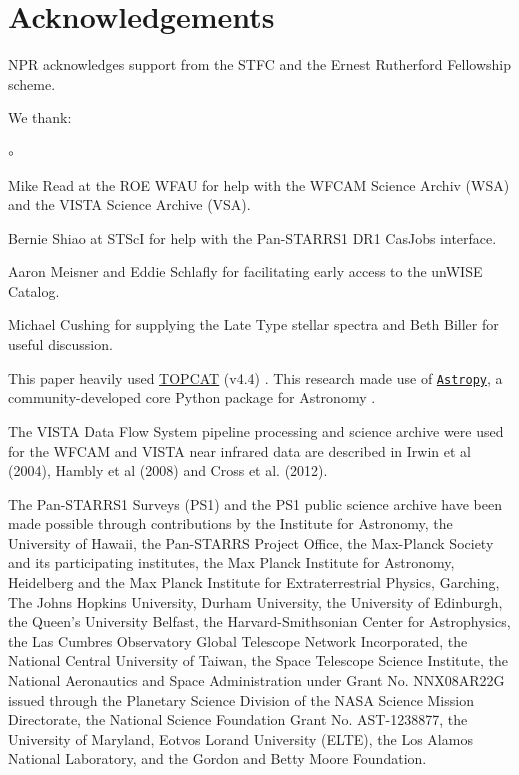 \documentclass[usenatbib]{mnras}
\begin{document}
\section*{Acknowledgements}
NPR acknowledges support from the STFC and the Ernest Rutherford Fellowship scheme. 

We thank:
\begin{list}{$\circ$}{}  
\item Mike Read at the ROE WFAU for help with the WFCAM Science Archiv (WSA) and the VISTA Science Archive (VSA). 
\item Bernie Shiao at STScI for help with the Pan-STARRS1 DR1 CasJobs interface. 
\item Aaron Meisner and Eddie Schlafly for facilitating early access to the unWISE Catalog. 
\item Michael Cushing for supplying the Late Type stellar spectra and Beth Biller for useful discussion. 
\end{list}


This paper heavily used \href{http://www.star.bris.ac.uk/~mbt/topcat/}{TOPCAT} (v4.4)
\citep[][]{Taylor2005, Taylor2011}.
This research made use of \href{http://www.astropy.org}{\tt Astropy}, 
a community-developed core Python package for Astronomy 
\citep{AstropyCollaboration2013, AstropyCollaboration2018}.

The VISTA Data Flow System pipeline processing and science archive were used for the WFCAM and VISTA 
near infrared data are described in Irwin et al (2004), Hambly et al (2008) and Cross et al. (2012). 

The Pan-STARRS1 Surveys (PS1) and the PS1 public science archive have
been made possible through contributions by the Institute for
Astronomy, the University of Hawaii, the Pan-STARRS Project Office,
the Max-Planck Society and its participating institutes, the Max
Planck Institute for Astronomy, Heidelberg and the Max Planck
Institute for Extraterrestrial Physics, Garching, The Johns Hopkins
University, Durham University, the University of Edinburgh, the
Queen's University Belfast, the Harvard-Smithsonian Center for
Astrophysics, the Las Cumbres Observatory Global Telescope Network
Incorporated, the National Central University of Taiwan, the Space
Telescope Science Institute, the National Aeronautics and Space
Administration under Grant No. NNX08AR22G issued through the Planetary
Science Division of the NASA Science Mission Directorate, the National
Science Foundation Grant No. AST-1238877, the University of Maryland,
Eotvos Lorand University (ELTE), the Los Alamos National Laboratory,
and the Gordon and Betty Moore Foundation.
\end{document}
